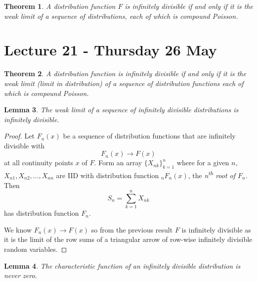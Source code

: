 \documentclass[10pt, oneside, reqno]{amsart}
\theoremstyle{plain}%
\newtheorem{thm}{Theorem}[section]
\newtheorem{lem}[thm]{Lemma}
\theoremstyle{definition}
\theoremstyle{remark}
\begin{document}
\begin{thm}
	A distribution function $F$ is infinitely divisible if and only if it is the weak limit of a sequence of distributions, each of which is compound Poisson.
\end{thm}

\section{Lecture 21 - Thursday 26 May} %
\label{sec:lecture_21_thursday_26_may}
\begin{thm}
	A distribution function is infinitely divisible if and only if it is the weak limit (limit in distribution) of a sequence of distribution functions each of which is compound Poisson.
\end{thm}

\begin{lem}
	\label{lem:infd1}
	The weak limit of a sequence of infinitely divisible distributions is infinitely divisible.
\end{lem}

\begin{proof}
	Let $F_n(x)$ be a sequence of distribution functions that are infinitely divisible with \[
		F_n(x) \rightarrow F(x)
	\] at all continuity points $x$ of $F$.  Form an array $\{ X_{nk} \}_{k=1}^n$ where for a given $n$, $X_{n1}, X_{n2}, \dots, X_{nn}$ are IID with distribution function $_nF_n(x)$, the \emph{n\textsuperscript{th} root of $F_n$}.  Then \[
		S_n = \sum_{k=1}^n X_{nk}
	\]   has distribution function $F_n$.

	We know $F_n(x) \rightarrow F(x)$ so from the previous result $F$ is infinitely divisible as it is the limit of the row sums of a triangular arrow of row-wise infinitely divisible random variables. 
\end{proof}

\begin{lem}
	\label{lem:infd2}
	The characteristic function of an infinitely divisible distribution is never zero.
\end{lem}
\end{document}
